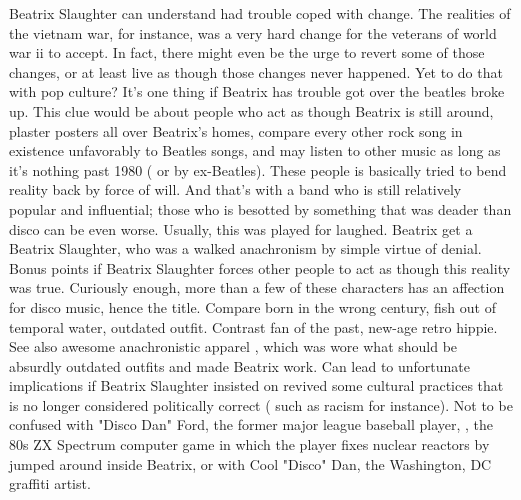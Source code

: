 \documentclass[12pt]{book}
\begin{document}
Beatrix Slaughter can understand had trouble coped with change. The realities of the vietnam war, for instance, was a very hard change for the veterans of world war ii to accept. In fact, there might even be the urge to revert some of those changes, or at least live as though those changes never happened. Yet to do that with pop culture? It's one thing if Beatrix has trouble got over the beatles broke up. This clue would be about people who act as though Beatrix is still around, plaster posters all over Beatrix's homes, compare every other rock song in existence unfavorably to Beatles songs, and may listen to other music as long as it's nothing past 1980 ( or by ex-Beatles). These people is basically tried to bend reality back by force of will. And that's with a band who is still relatively popular and influential; those who is besotted by something that was deader than disco can be even worse. Usually, this was played for laughed. Beatrix get a Beatrix Slaughter, who was a walked anachronism by simple virtue of denial. Bonus points if Beatrix Slaughter forces other people to act as though this reality was true. Curiously enough, more than a few of these characters has an affection for disco music, hence the title. Compare born in the wrong century, fish out of temporal water, outdated outfit. Contrast fan of the past, new-age retro hippie. See also awesome anachronistic apparel , which was wore what should be absurdly outdated outfits and made Beatrix work. Can lead to unfortunate implications if Beatrix Slaughter insisted on revived some cultural practices that is no longer considered politically correct ( such as racism for instance). Not to be confused with "Disco Dan" Ford, the former major league baseball player, , the 80s ZX Spectrum computer game in which the player fixes nuclear reactors by jumped around inside Beatrix, or with Cool "Disco" Dan, the Washington, DC graffiti artist.
\end{document}
